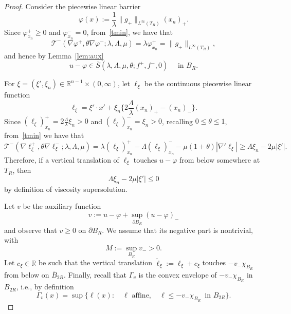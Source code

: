 \documentclass[10pt,a4paper]{amsart}
\newcommand{\R}{\mathbb{R}}
\newcommand{\chara}[1]{\chi_{#1}}
\newcommand{\tcal}{\mathcal{T}}
\begin{document}
\begin{proof}
Consider the piecewise linear barrier
\begin{equation}
\label{abp:bar}
\varphi(x) := \frac{1}{\lambda} \|g_{+}\|_{L^{\infty}(T_R)} (x_n)_{+}.
\end{equation}
Since $\varphi_{x_n}^{+} \geq 0$ and $\varphi_{x_n}^{-} = 0$, from~\eqref{tmin}, we have that
\[
\tcal^{-}(\nabla \varphi^{+},\theta \nabla \varphi^{-}; \lambda, \Lambda, \mu)
= \lambda \varphi_{x_n}^{+}
=  \|g_{+}\|_{L^{\infty}(T_R)},
\]
and hence by Lemma~\ref{lem:aux}
\begin{equation}
\label{abp:sup}
u- \varphi \in \overline{S}(\lambda, \Lambda, \mu, \theta; f^{+}, f^{-}, 0) \quad \text{ in } B_R.
\end{equation}

\medskip

For $\xi = (\xi', \xi_n) \in \R^{n-1} \times (0,\infty)$, let $\ell_{\xi}$ be the continuous piecewise linear function
\begin{equation}
\label{abp:piece}
\ell_{\xi} 
= \xi' \cdot x' + \xi_n\Big\{ 2\frac{\Lambda}{\lambda} (x_n)_{+} - (x_n)_{-}\Big\}.
\end{equation}
Since $(\ell_{\xi})_{x_n}^{+} = 2 \frac{\Lambda}{\lambda}\xi_n >0$ and $(\ell_{\xi})_{x_n}^{-} = \xi_n >0$, recalling $0 \leq \theta \leq 1$, from~\eqref{tmin} we have that
\[
\tcal^{-} (\nabla \ell_{\xi}^{+}, \theta \nabla \ell_{\xi}^{-}; \lambda, \Lambda, \mu) 
= \lambda(\ell_{\xi})_{x_n}^{+} - \Lambda (\ell_{\xi})_{x_n}^{-} - \mu(1+\theta) |\nabla' \ell_{\xi}|
\geq \Lambda \xi_n - 2 \mu |\xi'|.
\]
Therefore, if a vertical translation of $\ell_{\xi}$ touches $u-\varphi$ from below somewhere at $T_R$, then 
\begin{equation}
\label{abp:trans}
\Lambda \xi_n - 2\mu |\xi'| \leq 0
\end{equation}
by definition of viscosity supersolution.

\medskip

Let $v$ be the auxiliary function
\begin{equation}
\label{abp:v}
v := u- \varphi + \sup_{\partial B_R} (u-\varphi)_{-}
\end{equation}
and observe that $v \geq 0$ on $\partial B_R$.
We assume that its negative part is nontrivial, with
\begin{equation}
\label{abp:mdef}
M := \sup_{B_R} v_{-} > 0.
\end{equation}
Let $c_{\xi} \in \R$ be such that the vertical translation $\widetilde{\ell}_{\xi} := \ell_{\xi} + c_{\xi}$ touches $- v_{-} \chara{B_R}$ from below on $\overline{B}_{2R}$.
Finally, recall that $\Gamma_{v}$ is the convex envelope of $- v_{-} \chara{B_R}$ in $B_{2R}$, i.e., by definition
\[
\Gamma_v(x) = \sup\big\{
\ell(x) \colon \quad \ell \text{ affine}, \quad \ell \leq - v_{-} \chara{B_R} \, \text{ in } B_{2R}
\big\}.
\]


\end{proof}
\end{document}
